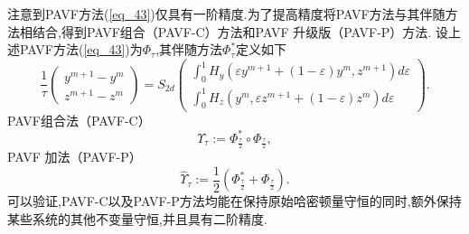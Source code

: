 注意到PAVF方法(\ref{eq_43})仅具有一阶精度\cite{caiPartitionedAveragedVector2018}.为了提高精度将PAVF方法与其伴随方法相结合,得到PAVF组合（PAVF-C）方法和PAVF 升级版（PAVF-P）方法.
设上述PAVF方法(\ref{eq_43})为$\Phi_{\tau}$,其伴随方法$\Phi_{\tau}^{*}$定义如下
\begin{equation}
\frac{1}{\tau}\left(\begin{array}{c}
y^{m+1}-y^{m} \\
z^{m+1}-z^{m}
\end{array}\right)=S_{2 d}\left(\begin{array}{c}
\int_{0}^{1} H_{y}\left(\varepsilon y^{m+1}+(1-\varepsilon) y^{m}, z^{m+1}\right) d \varepsilon \\
\int_{0}^{1} H_{z}\left(y^{m}, \varepsilon z^{m+1}+(1-\varepsilon) z^{m}\right) d \varepsilon
\end{array}\right).
\label{eq_44}\end{equation}
PAVF组合法（PAVF-C）
\begin{equation}
\Upsilon_{\tau}:=\Phi_{\frac{\tau}{2}}^{*} \circ \Phi_{\frac{\tau}{2}},
\label{eq_45}\end{equation}
PAVF 加法（PAVF-P）
\begin{equation}
\hat{\Upsilon}_{\tau}:=\frac{1}{2}\left(\Phi_{\frac{\tau}{2}}^{*}+\Phi_{\frac{\tau}{2}}\right).
\label{eq_46}\end{equation}
可以验证,PAVF-C以及PAVF-P方法均能在保持原始哈密顿量守恒的同时,额外保持某些系统的其他不变量守恒,并且具有二阶精度\cite{caiPartitionedAveragedVector2018}.




